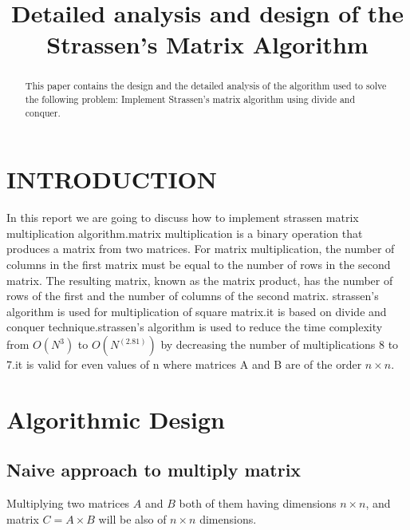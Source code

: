 \documentclass[conference]{IEEEtran}
\begin{document}
\title{Detailed analysis and design of the Strassen’s Matrix Algorithm\\

}

\author{
\and
{}
\and
{}
}

\maketitle

\begin{abstract}
This paper contains the design and the detailed analysis of the algorithm used to solve the following problem: Implement Strassen’s matrix algorithm using divide and
conquer.
\end{abstract}
\section{INTRODUCTION}
In this report we are going to discuss how to implement strassen matrix multiplication algorithm.matrix multiplication is a binary operation that produces a matrix from two matrices. For matrix multiplication, the number of columns in the first matrix must be equal to the number of rows in the second matrix. The resulting matrix, known as the matrix product, has the number of rows of the first and the number of columns of the second matrix. strassen's algorithm is used for multiplication of square matrix.it is based on divide and conquer technique.strassen's algorithm is used to reduce the time complexity from $O(N^3)$ to $O(N^(2.81))$ by decreasing the number of multiplications 8 to 7.it is valid for even values of n where matrices A and B are of the order $n\times n$.

\section{Algorithmic Design}

\subsection{Naive approach to multiply matrix}

Multiplying two matrices $A$ and $B$ both of them having dimensions $n\times n$, and matrix $C = A\times B$ will be also of $n\times n$ dimensions.
\end{document}
